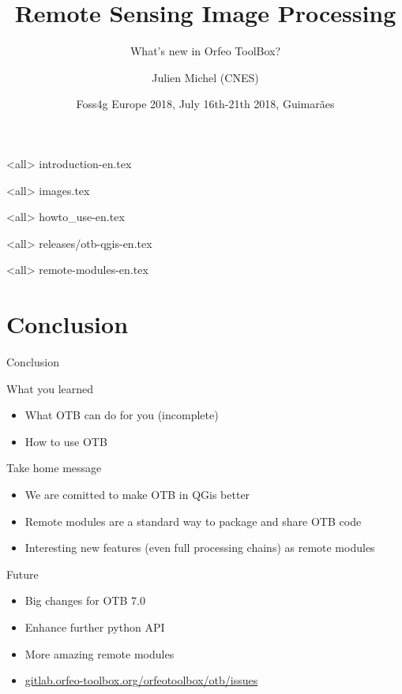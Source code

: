 \documentclass[8pt]{beamer}
\title{Remote Sensing Image Processing}
\subtitle{What's new in Orfeo ToolBox?}
\author{Julien Michel (CNES)}
\date{Foss4g Europe 2018, July 16th-21th 2018, Guimarães}
\begin{document}
\begin{frame}
\titlepage
\end{frame}

\mode<all>
{introduction-en.tex}

\mode<all>
{images.tex}


\mode<all>
{howto_use-en.tex}

\mode<all>
{releases/otb-qgis-en.tex}

\mode<all>
{remote-modules-en.tex}

\section*{Conclusion}

\begin{frame}{Conclusion}

  \begin{block}{What you learned}
    \begin{itemize}
      \item What OTB can do for you (incomplete)
      \item How to use OTB
    \end{itemize}
  \end{block}
  
  \begin{block}{Take home message}
    \begin{itemize}
    \item We are comitted to make OTB in QGis better
    \item Remote modules are a standard way to package and share OTB code
    \item Interesting new features (even full processing chains) as remote modules
    \end{itemize}
  \end{block}

  \begin{block}{Future}
    \begin{itemize}
      \item Big changes for OTB 7.0
      \item Enhance further python API
      \item More amazing remote modules
      \item \url{gitlab.orfeo-toolbox.org/orfeotoolbox/otb/issues}
    \end{itemize}
  \end{block}
\end{frame}
\end{document}
